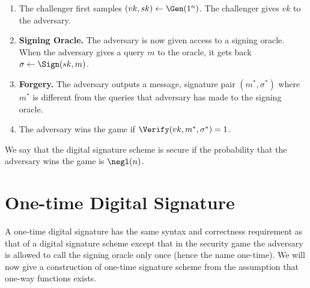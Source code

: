 \begin{enumerate}
    \item The challenger first samples $(vk,sk) \gets \Gen(1^n)$. The challenger gives $vk$ to the adversary.
    \item \textbf{Signing Oracle.} The adversary is now given access to a signing oracle. When the adversary gives a query $m$ to the oracle, it gets back $\sigma \gets \Sign(sk,m)$.
    \item \textbf{Forgery.} The adversary outputs a message, signature pair $(m^*,\sigma^*)$ where $m^*$ is different from the queries that adversary has made to the signing oracle.
    \item The adversary wins the game if $\Verify(vk,m^*,\sigma^*) = 1$.
\end{enumerate}
We say that the digital signature scheme is secure if the probability that the adversary wins the game is $\negl(n)$.

\section{One-time Digital Signature}
\label{lampart}
A one-time digital signature has the same syntax and correctness requirement as that of a digital signature scheme except that in the security game the adversary is allowed to call the signing oracle only once (hence the name one-time). We will now give a construction of one-time signature scheme from the assumption that one-way functions exists.

